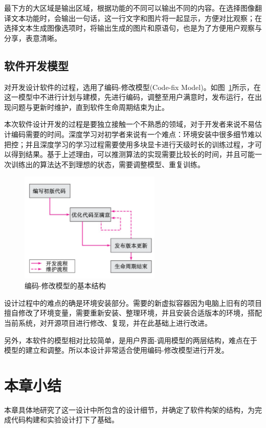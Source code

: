   最下方的大区域是输出区域，根据功能的不同可以输出不同的内容。在选择图像翻译文本功能时，会输出一句话，这一行文字和图片将一起显示，方便对比观察；在选择文本生成图像选项时，将输出生成的图片和原语句，也是为了方便用户观察与分享，表意清晰。

\subsection{软件开发模型}
对开发设计软件的过程，选用了编码-修改模型(Code-fix Model)。如图~\ref{fig:codenfix}所示，在这一模型中不进行计划与建模，先进行编码，调整至用户满意时，发布运行，在出现问题与更新时维护，直到软件生命周期结束为止。

本次软件设计开发的过程是要独立接触一个不熟悉的领域，对于开发者来说不易估计编码需要的时间。深度学习对初学者来说有一个难点：环境安装中很多细节难以把控；并且深度学习的学习过程需要使用多块显卡进行天级时长的训练过程，才可以得到结果。基于上述理由，可以推测算法的实现需要比较长的时间，并且可能一次训练出的算法达不到理想的状态，需要调整模型、重复训练。

\begin{figure}[!htb]
    \centering
    \includegraphics[width=0.6\textwidth]{figures/codeandfix.png}
    \caption{编码-修改模型的基本结构}
    \label{fig:codenfix}
\end{figure}

设计过程中的难点的确是环境安装部分。需要的新虚拟容器因为电脑上旧有的项目擅自修改了环境变量，需要重新安装、整理环境，并且安装合适版本的环境，搭配当前系统，对开源项目进行修改、复现，并在此基础上进行改进。

另外，本软件的模型相对比较简单，是用户界面-调用模型的两层结构，难点在于模型的建立和调整。所以本设计非常适合使用编码-修改模型进行开发。

\section{本章小结}
本章具体地研究了这一设计中所包含的设计细节，并确定了软件构架的结构，为完成代码构建和实验设计打下了基础。


